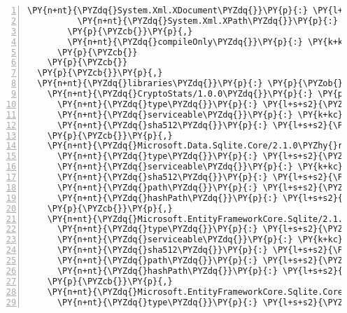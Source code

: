 \begin{Verbatim}[commandchars=\\\{\},numbers=left,firstnumber=1,stepnumber=1,numberblanklines=0]
          \PY{n+nt}{\PYZdq{}System.Xml.XDocument\PYZdq{}}\PY{p}{:} \PY{l+s+s2}{\PYZdq{}4.3.0\PYZdq{}}\PY{p}{,}
          \PY{n+nt}{\PYZdq{}System.Xml.XPath\PYZdq{}}\PY{p}{:} \PY{l+s+s2}{\PYZdq{}4.3.0\PYZdq{}}
        \PY{p}{\PYZcb{}}\PY{p}{,}
        \PY{n+nt}{\PYZdq{}compileOnly\PYZdq{}}\PY{p}{:} \PY{k+kc}{true}
      \PY{p}{\PYZcb{}}
    \PY{p}{\PYZcb{}}
  \PY{p}{\PYZcb{}}\PY{p}{,}
  \PY{n+nt}{\PYZdq{}libraries\PYZdq{}}\PY{p}{:} \PY{p}{\PYZob{}}
    \PY{n+nt}{\PYZdq{}CryptoStats/1.0.0\PYZdq{}}\PY{p}{:} \PY{p}{\PYZob{}}
      \PY{n+nt}{\PYZdq{}type\PYZdq{}}\PY{p}{:} \PY{l+s+s2}{\PYZdq{}project\PYZdq{}}\PY{p}{,}
      \PY{n+nt}{\PYZdq{}serviceable\PYZdq{}}\PY{p}{:} \PY{k+kc}{false}\PY{p}{,}
      \PY{n+nt}{\PYZdq{}sha512\PYZdq{}}\PY{p}{:} \PY{l+s+s2}{\PYZdq{}\PYZdq{}}
    \PY{p}{\PYZcb{}}\PY{p}{,}
    \PY{n+nt}{\PYZdq{}Microsoft.Data.Sqlite.Core/2.1.0\PYZhy{}rc1\PYZhy{}final\PYZdq{}}\PY{p}{:} \PY{p}{\PYZob{}}
      \PY{n+nt}{\PYZdq{}type\PYZdq{}}\PY{p}{:} \PY{l+s+s2}{\PYZdq{}package\PYZdq{}}\PY{p}{,}
      \PY{n+nt}{\PYZdq{}serviceable\PYZdq{}}\PY{p}{:} \PY{k+kc}{true}\PY{p}{,}
      \PY{n+nt}{\PYZdq{}sha512\PYZdq{}}\PY{p}{:} \PY{l+s+s2}{\PYZdq{}sha512\PYZhy{}AESaEkjngwCsc8bioq5cQfNP5TrDYVSQcQdHH/1te+ckM5YO9opMnHLPEYOnBq2bYRCO4D1n82Tet4pJROklbw==\PYZdq{}}\PY{p}{,}
      \PY{n+nt}{\PYZdq{}path\PYZdq{}}\PY{p}{:} \PY{l+s+s2}{\PYZdq{}microsoft.data.sqlite.core/2.1.0\PYZhy{}rc1\PYZhy{}final\PYZdq{}}\PY{p}{,}
      \PY{n+nt}{\PYZdq{}hashPath\PYZdq{}}\PY{p}{:} \PY{l+s+s2}{\PYZdq{}microsoft.data.sqlite.core.2.1.0\PYZhy{}rc1\PYZhy{}final.nupkg.sha512\PYZdq{}}
    \PY{p}{\PYZcb{}}\PY{p}{,}
    \PY{n+nt}{\PYZdq{}Microsoft.EntityFrameworkCore.Sqlite/2.1.0\PYZhy{}rc1\PYZhy{}final\PYZdq{}}\PY{p}{:} \PY{p}{\PYZob{}}
      \PY{n+nt}{\PYZdq{}type\PYZdq{}}\PY{p}{:} \PY{l+s+s2}{\PYZdq{}package\PYZdq{}}\PY{p}{,}
      \PY{n+nt}{\PYZdq{}serviceable\PYZdq{}}\PY{p}{:} \PY{k+kc}{true}\PY{p}{,}
      \PY{n+nt}{\PYZdq{}sha512\PYZdq{}}\PY{p}{:} \PY{l+s+s2}{\PYZdq{}sha512\PYZhy{}u6hnK2G/bZ1ogNyuIqTs2fNzlVwioKIglSl27jbr2epw2LnhsyqrKpoSLCWR6geE9aCpI8pN+a3TJX+TH0CRvg==\PYZdq{}}\PY{p}{,}
      \PY{n+nt}{\PYZdq{}path\PYZdq{}}\PY{p}{:} \PY{l+s+s2}{\PYZdq{}microsoft.entityframeworkcore.sqlite/2.1.0\PYZhy{}rc1\PYZhy{}final\PYZdq{}}\PY{p}{,}
      \PY{n+nt}{\PYZdq{}hashPath\PYZdq{}}\PY{p}{:} \PY{l+s+s2}{\PYZdq{}microsoft.entityframeworkcore.sqlite.2.1.0\PYZhy{}rc1\PYZhy{}final.nupkg.sha512\PYZdq{}}
    \PY{p}{\PYZcb{}}\PY{p}{,}
    \PY{n+nt}{\PYZdq{}Microsoft.EntityFrameworkCore.Sqlite.Core/2.1.0\PYZhy{}rc1\PYZhy{}final\PYZdq{}}\PY{p}{:} \PY{p}{\PYZob{}}
      \PY{n+nt}{\PYZdq{}type\PYZdq{}}\PY{p}{:} \PY{l+s+s2}{\PYZdq{}package\PYZdq{}}\PY{p}{,}

\end{Verbatim}
